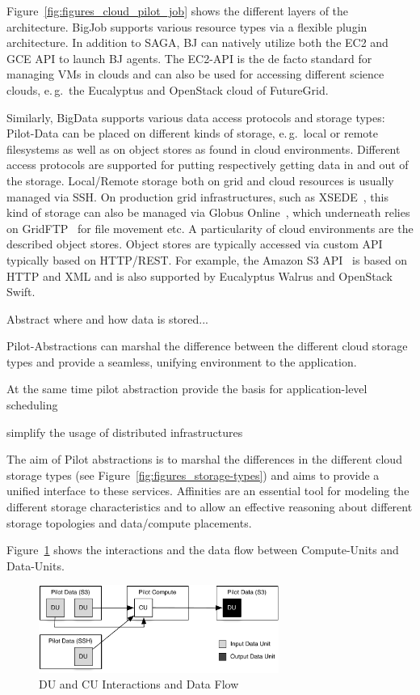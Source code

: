 \documentclass[times]{cpeauth}
\newcommand{\pilotdata}{Pilot-Data\xspace}
\newcommand{\computeunits}{Compute-Units\xspace}
\newcommand{\dataunits}{Data-Units\xspace}
\begin{document}
Figure~\ref{fig:figures_cloud_pilot_job} shows the different layers of the
architecture. BigJob supports various resource types via a flexible plugin
architecture. In addition to SAGA, BJ can natively utilize both the EC2 and
GCE API to launch BJ agents. The EC2-API is the de facto standard for managing
VMs in clouds and can also be used for accessing different science clouds,
e.\,g.\ the Eucalyptus and OpenStack cloud of FutureGrid. 

Similarly, BigData supports various data access protocols and storage types:
\pilotdata can be placed on different kinds of storage, e.\,g.\ local or
remote filesystems as well as on object stores as found in cloud environments.
Different access protocols are supported for putting respectively getting data
in and out of the storage. Local/Remote storage both on grid and cloud
resources is usually managed via SSH. On production grid infrastructures, such
as XSEDE~\cite{xsede}, this kind of storage can also be managed via Globus
Online~\cite{10.1109/MIC.2011.64}, which underneath relies on
GridFTP~\cite{ogf-gfd-20} for file movement etc. A particularity of cloud
environments are the described object stores. Object stores are typically
accessed via custom API typically based on HTTP/REST. For example, the Amazon
S3 API~\cite{amazons3api} is based on HTTP and XML and is also supported by
Eucalyptus Walrus and OpenStack Swift.




Abstract where and how data is stored...

Pilot-Abstractions can marshal the difference between the different cloud storage types and provide a seamless, unifying environment to the application.

At the same time pilot abstraction provide the basis for application-level 
scheduling

simplify the usage of distributed infrastructures





The aim of Pilot abstractions is to marshal the differences in the different 
cloud storage types (see Figure~\ref{fig:figures_storage-types}) and aims to 
provide a unified interface to these services. Affinities are an essential 
tool for modeling the different storage characteristics and to allow an 
effective reasoning about different storage topologies and data/compute 
placements.


Figure~\ref{fig:figures_data-flow} shows the interactions and the data flow 
between \computeunits and \dataunits.
\begin{figure}[htbp]
	\centering
		\includegraphics[width=0.7\textwidth]{figures/data-flow.pdf}
	\caption{DU and CU Interactions and Data Flow}
	\label{fig:figures_data-flow}
\end{figure}
\end{document}
